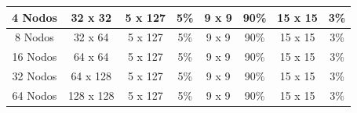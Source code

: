 {\begin{table}[tb]
\begin{tabular}{|c|c|c|c|c|c|c|c|}
4 Nodos                                                   & 32 x 32                                                 & 5 x 127                                                 & 5\%                                                   & 9 x 9                                                & 90\%                                                 & 15 x 15                                                             & 3\%                                                    \\ \hline
8 Nodos                                                   & 32 x 64                                                 & 5 x 127                                                 & 5\%                                                   & 9 x 9                                                & 90\%                                                 & 15 x 15                                                             & 3\%                                                    \\ \hline
16 Nodos                                                  & 64 x 64                                                 & 5 x 127                                                 & 5\%                                                   & 9 x 9                                                & 90\%                                                 & 15 x 15                                                             & 3\%                                                    \\ \hline
32 Nodos                                                  & 64 x 128                                                & 5 x 127                                                 & 5\%                                                   & 9 x 9                                                & 90\%                                                 & 15 x 15                                                             & 3\%                                                    \\ \hline
64 Nodos                                                  & 128 x 128                                               & 5 x 127                                                 & 5\%                                                   & 9 x 9                                                & 90\%                                                 & 15 x 15                                                             & 3\%                                                    \\ \hline
\end{tabular}%
\label{Weak_Scaling_Models}
\end{table}

}
